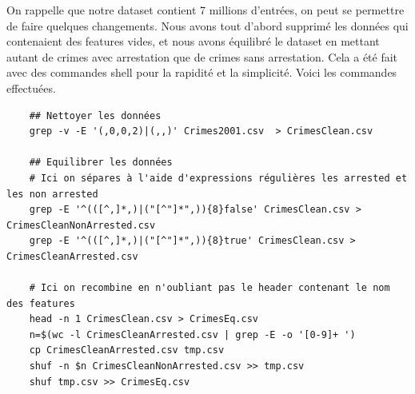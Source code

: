 \documentclass{article}
\begin{document}
    On rappelle que notre dataset contient 7 millions d'entrées, on peut se permettre
    de faire quelques changements.
    Nous avons tout d'abord supprimé les données qui contenaient des features vides,
    et nous avons équilibré le dataset en mettant autant de crimes avec arrestation que de crimes sans arrestation.
    Cela a été fait avec des commandes shell pour la rapidité et la simplicité. 
    Voici les commandes effectuées.

    \begin{Verbatim}
    ## Nettoyer les données
    grep -v -E '(,0,0,2)|(,,)' Crimes2001.csv  > CrimesClean.csv
    
    ## Equilibrer les données
    # Ici on sépares à l'aide d'expressions régulières les arrested et les non arrested
    grep -E '^(([^,]*,)|("[^"]*",)){8}false' CrimesClean.csv > CrimesCleanNonArrested.csv
    grep -E '^(([^,]*,)|("[^"]*",)){8}true' CrimesClean.csv > CrimesCleanArrested.csv
 
    # Ici on recombine en n'oubliant pas le header contenant le nom des features
    head -n 1 CrimesClean.csv > CrimesEq.csv
    n=$(wc -l CrimesCleanArrested.csv | grep -E -o '[0-9]+ ')
    cp CrimesCleanArrested.csv tmp.csv
    shuf -n $n CrimesCleanNonArrested.csv >> tmp.csv
    shuf tmp.csv >> CrimesEq.csv
    \end{Verbatim}
\end{document}
